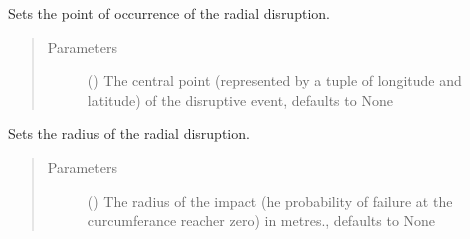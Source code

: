 \documentclass[letterpaper,10pt,english]{sphinxmanual}
\begin{document}
\begin{fulllineitems}
\begin{fulllineitems}
\end{fulllineitems}


\begin{fulllineitems}
\label{\detokenize{apidoc:dreaminsg_integrated_model.src.hazard_initiator.RadialDisruption.set_point_of_occurrence}}
\sphinxAtStartPar
Sets the point of occurrence of the radial disruption.
\begin{quote}\begin{description}
\item[{Parameters}] \leavevmode
\sphinxAtStartPar
{} (\sphinxstyleliteralemphasis{\sphinxupquote{, }}) \textendash{} The central point (represented by a tuple of longitude and latitude) of the disruptive event, defaults to None

\end{description}\end{quote}

\end{fulllineitems}


\begin{fulllineitems}
\label{\detokenize{apidoc:dreaminsg_integrated_model.src.hazard_initiator.RadialDisruption.set_radius_of_impact}}
\sphinxAtStartPar
Sets the radius of the radial disruption.
\begin{quote}\begin{description}
\item[{Parameters}] \leavevmode
\sphinxAtStartPar
{} (\sphinxstyleliteralemphasis{\sphinxupquote{, }}) \textendash{} The radius of the impact (he probability of failure at the curcumferance reacher zero) in metres., defaults to None


\end{description}
\end{quote}
\end{fulllineitems}
\end{fulllineitems}
\end{document}
